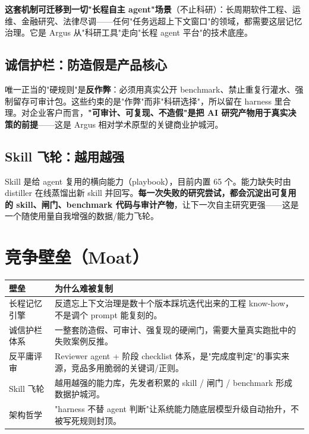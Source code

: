 \documentclass[UTF8,11pt,fontset=none]{ctexart}
\newcommand{\thd}[1]{\textbf{\color{white}#1}}
\newcommand{\headrow}{\rowcolor{argusnavy}}
\newcommand{\altrow}{\rowcolor{arguslight}}
\begin{document}
\textbf{这套机制可迁移到一切"长程自主 agent"场景}（不止科研）：长周期软件工程、运维、金融研究、法律尽调——任何"任务远超上下文窗口"的领域，都需要这层记忆治理。它是 Argus 从"科研工具"走向"长程 agent 平台"的技术底座。

\subsection{诚信护栏：防造假是产品核心}

唯一正当的"硬规则"是\textbf{反作弊}：必须用真实公开 benchmark、禁止重复行灌水、强制留存可审计包。这些约束的是"作弊"而非"科研选择"，所以留在 harness 里合理。对企业客户而言，\textbf{"可审计、可复现、不造假"是把 AI 研究产物用于真实决策的前提}——这是 Argus 相对学术原型的关键商业护城河。

\subsection{Skill 飞轮：越用越强}

Skill 是给 agent 复用的横向能力（playbook），目前内置 65 个。能力缺失时由 distiller 在线蒸馏出新 skill 并回写。\textbf{每一次失败的研究尝试，都会沉淀出可复用的 skill、闸门、benchmark 代码与审计产物}，让下一次自主研究更强——这是一个随使用量自我增强的数据/能力飞轮。

\section{竞争壁垒（Moat）}

\begin{tabularx}{\textwidth}{@{}>{\raggedright\arraybackslash}p{4.2cm} X@{}}
\toprule
\headrow \thd{壁垒} & \thd{为什么难被复制} \\
\midrule
\altrow 长程记忆引擎 & 反遗忘上下文治理是数十个版本踩坑迭代出来的工程 know-how，不是调个 prompt 能复刻的。 \\
诚信护栏体系 & 一整套防造假、可审计、强复现的硬闸门，需要大量真实跑批中的失败案例反推。 \\
\altrow 反平庸评审 & Reviewer agent + 阶段 checklist 体系，是"完成度判定"的事实来源，竞品多用脆弱的关键词/正则。 \\
Skill 飞轮 & 越用越强的能力库，先发者积累的 skill / 闸门 / benchmark 形成数据护城河。 \\
\altrow 架构哲学 & "harness 不替 agent 判断"让系统能力随底层模型升级自动抬升，不被写死规则封顶。 \\
\bottomrule
\end{tabularx}
\end{document}
